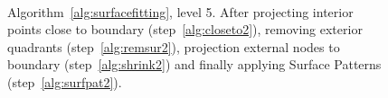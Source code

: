\documentclass[10pt]{article}
\begin{document}
%
\begin{figure}[htb]
\centering
 \\
 \caption{Algorithm~\ref{alg:surfacefitting}, level 5. After projecting interior points close to boundary (step~\ref{alg:closeto2}), removing exterior quadrants (step~\ref{alg:remsur2}), projection external nodes to boundary (step~\ref{alg:shrink2}) and finally applying Surface Patterns (step~\ref{alg:surfpat2}).}
\label{fig:surfacehandling5}
\end{figure}
\end{document}
